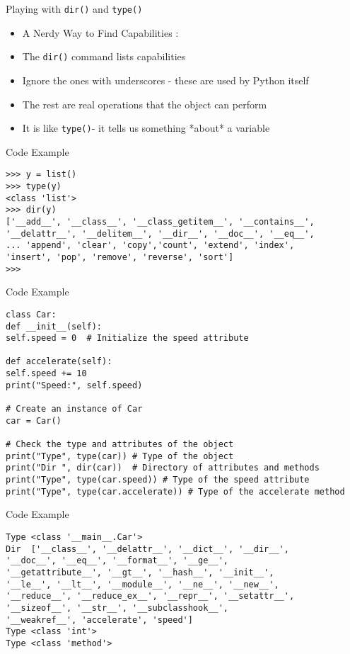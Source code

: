 \documentclass[serif, aspectratio=169]{beamer}
\begin{document}
\begin{frame}{Playing with \texttt{\color{red}dir()} and \texttt{\color{red}type()}}
	\begin{itemize}
	\item A Nerdy Way to Find Capabilities :
	\item The \texttt{\color{red}dir()} command lists capabilities
	\item Ignore the ones with underscores - these are used by Python itself
	\item The rest are real operations that the object can perform
	\item It is like \texttt{\color{red}type()}- it tells us something *about* a variable
	
	\end{itemize}
\end{frame}

\begin{frame}[fragile]{Code Example}
    \begin{lstlisting}
>>> y = list()
>>> type(y)
<class 'list'>
>>> dir(y)
['__add__', '__class__', '__class_getitem__', '__contains__', 
'__delattr__', '__delitem__', '__dir__', '__doc__', '__eq__',
... 'append', 'clear', 'copy','count', 'extend', 'index', 
'insert', 'pop', 'remove', 'reverse', 'sort']
>>> 
    \end{lstlisting}
\end{frame}


\begin{frame}[fragile]{Code Example}
    \begin{lstlisting}
class Car:
def __init__(self):
self.speed = 0  # Initialize the speed attribute

def accelerate(self):
self.speed += 10
print("Speed:", self.speed)

# Create an instance of Car
car = Car()

# Check the type and attributes of the object
print("Type", type(car)) # Type of the object
print("Dir ", dir(car))  # Directory of attributes and methods
print("Type", type(car.speed)) # Type of the speed attribute
print("Type", type(car.accelerate)) # Type of the accelerate method

    \end{lstlisting}
\end{frame}


\begin{frame}[fragile]{Code Example}
    \begin{lstlisting}
Type <class '__main__.Car'>
Dir  ['__class__', '__delattr__', '__dict__', '__dir__', 
'__doc__', '__eq__', '__format__', '__ge__', 
'__getattribute__', '__gt__', '__hash__', '__init__',
'__le__', '__lt__', '__module__', '__ne__', '__new__', 
'__reduce__', '__reduce_ex__', '__repr__', '__setattr__', 
'__sizeof__', '__str__', '__subclasshook__', 
'__weakref__', 'accelerate', 'speed']
Type <class 'int'>
Type <class 'method'>
    \end{lstlisting}
\end{frame}
\end{document}
